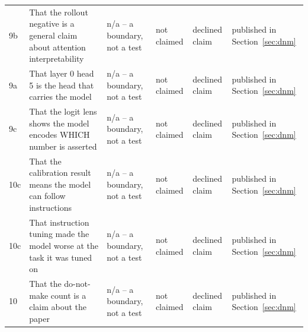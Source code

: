 {\begin{longtable}{L{0.9cm}L{2.8cm}L{2.7cm}L{3.0cm}L{1.9cm}L{2.1cm}}
9b & That the rollout negative is a general claim about attention interpretability & n/a -- a boundary, not a test & not claimed & declined claim & published in Section~\ref{sec:dnm} \\
9a & That layer 0 head 5 is the head that carries the model & n/a -- a boundary, not a test & not claimed & declined claim & published in Section~\ref{sec:dnm} \\
9c & That the logit lens shows the model encodes WHICH number is asserted & n/a -- a boundary, not a test & not claimed & declined claim & published in Section~\ref{sec:dnm} \\
10c & That the calibration result means the model can follow instructions & n/a -- a boundary, not a test & not claimed & declined claim & published in Section~\ref{sec:dnm} \\
10c & That instruction tuning made the model worse at the task it was tuned on & n/a -- a boundary, not a test & not claimed & declined claim & published in Section~\ref{sec:dnm} \\
10 & That the do-not-make count is a claim about the paper & n/a -- a boundary, not a test & not claimed & declined claim & published in Section~\ref{sec:dnm} \\
\end{longtable}
}
